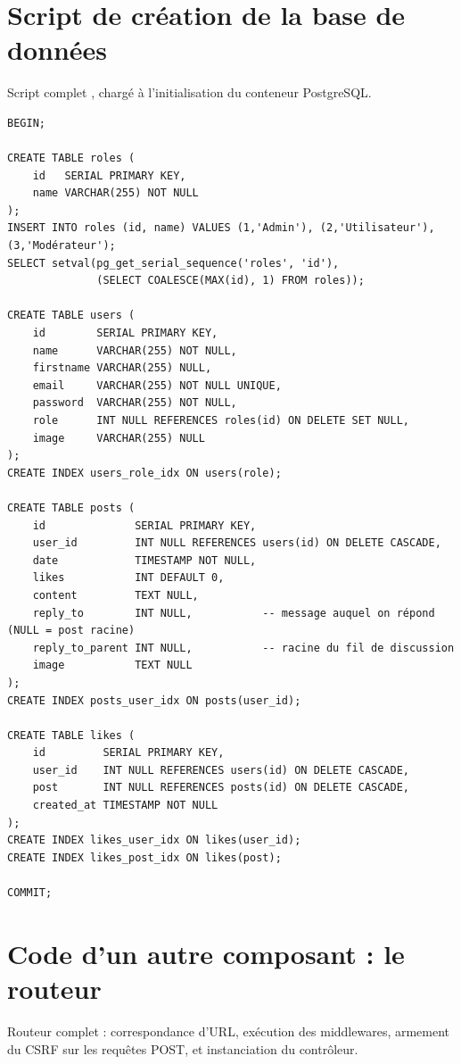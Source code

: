 \section{Script de création de la base de données}
\label{ann:sql}

Script complet , chargé à l'initialisation du conteneur PostgreSQL.

\begin{lstlisting}[style=sql]
BEGIN;

CREATE TABLE roles (
    id   SERIAL PRIMARY KEY,
    name VARCHAR(255) NOT NULL
);
INSERT INTO roles (id, name) VALUES (1,'Admin'), (2,'Utilisateur'), (3,'Modérateur');
SELECT setval(pg_get_serial_sequence('roles', 'id'),
              (SELECT COALESCE(MAX(id), 1) FROM roles));

CREATE TABLE users (
    id        SERIAL PRIMARY KEY,
    name      VARCHAR(255) NOT NULL,
    firstname VARCHAR(255) NULL,
    email     VARCHAR(255) NOT NULL UNIQUE,
    password  VARCHAR(255) NOT NULL,
    role      INT NULL REFERENCES roles(id) ON DELETE SET NULL,
    image     VARCHAR(255) NULL
);
CREATE INDEX users_role_idx ON users(role);

CREATE TABLE posts (
    id              SERIAL PRIMARY KEY,
    user_id         INT NULL REFERENCES users(id) ON DELETE CASCADE,
    date            TIMESTAMP NOT NULL,
    likes           INT DEFAULT 0,
    content         TEXT NULL,
    reply_to        INT NULL,           -- message auquel on répond (NULL = post racine)
    reply_to_parent INT NULL,           -- racine du fil de discussion
    image           TEXT NULL
);
CREATE INDEX posts_user_idx ON posts(user_id);

CREATE TABLE likes (
    id         SERIAL PRIMARY KEY,
    user_id    INT NULL REFERENCES users(id) ON DELETE CASCADE,
    post       INT NULL REFERENCES posts(id) ON DELETE CASCADE,
    created_at TIMESTAMP NOT NULL
);
CREATE INDEX likes_user_idx ON likes(user_id);
CREATE INDEX likes_post_idx ON likes(post);

COMMIT;
\end{lstlisting}

\section{Code d'un autre composant : le routeur}
\label{ann:router}

Routeur complet  : correspondance d'URL, exécution des middlewares, armement
du CSRF sur les requêtes POST, et instanciation du contrôleur.

